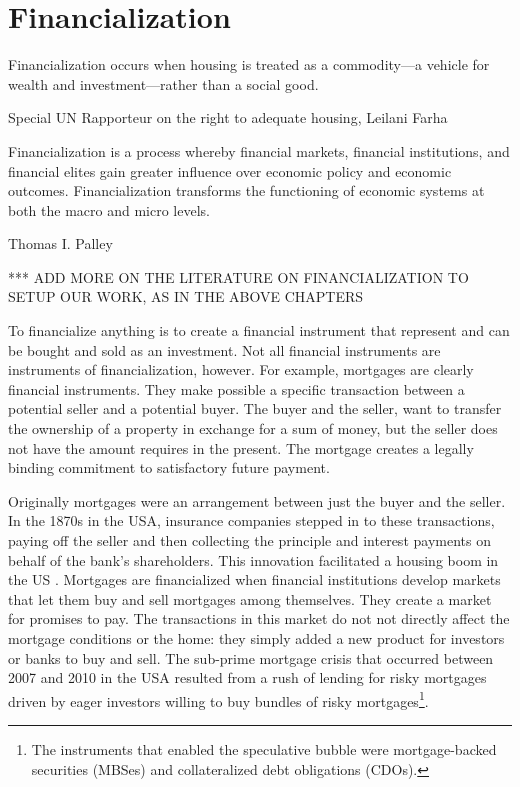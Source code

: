 \chapter{Financialization} \label{chapter-financialization}
\epigraph{Financialization  occurs when housing is treated as a commodity—a vehicle for wealth and investment—rather than a social good.}{Special UN Rapporteur on the right to adequate housing, Leilani Farha}
\epigraph{Financialization is a process whereby financial markets, financial institutions, and financial elites gain greater influence over economic policy and economic outcomes. Financialization transforms the functioning of economic systems at both the macro and micro levels.}{Thomas I. Palley \cite{palleyFinancializationWhatIt2007}}
*** ADD MORE ON THE LITERATURE ON FINANCIALIZATION TO SETUP OUR WORK, AS IN THE ABOVE CHAPTERS

To financialize anything is to create a  financial instrument that represent and can be bought and sold as an investment. Not all financial instruments are instruments of financialization, however. For example, mortgages are clearly financial instruments. They make possible a specific transaction between a potential seller and a potential buyer. The buyer and the seller, want to transfer the ownership of a property in exchange for a sum of money, but the seller does not have the amount requires in the present. The mortgage creates a legally binding commitment to satisfactory future payment.  %

Originally mortgages were an arrangement between just the buyer and the seller. In the 1870s in the USA,  insurance companies stepped in to these transactions, paying off the seller and then collecting the principle and interest payments on behalf of the bank's shareholders. This innovation facilitated a housing boom in the US . Mortgages are financialized when financial institutions develop markets that let them buy and sell mortgages among themselves. They  create a market for promises to pay. The transactions in this market do not not directly affect the mortgage conditions or the home: they simply added a new product for investors or banks  to buy and sell. The sub-prime mortgage crisis that occurred between 2007 and 2010 in the USA resulted from a rush of lending for risky mortgages driven by eager investors willing  to buy bundles of risky mortgages\footnote{The instruments that enabled the speculative bubble were mortgage-backed securities (MBSes) and collateralized debt obligations (CDOs). }.  

